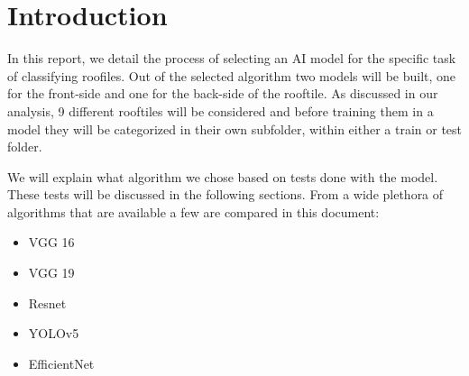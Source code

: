 \section{Introduction}

\begin{fullwidth}
    In this report, 
    we detail the process of selecting an AI model for the specific task of classifying roofiles. 
    Out of the selected algorithm two models will be built, one for the front-side and one for the back-side of the rooftile. 
    As discussed in our analysis, 9 different rooftiles will be considered and before training them in a model 
    they will be categorized in their own subfolder, within either a train or test folder.

    We will explain what algorithm we chose based on tests done with the model. These tests will be discussed in the following sections.
    From a wide plethora of algorithms that are available a few are compared in this document:
    \begin{itemize} 
    \item VGG 16
    \item VGG 19
    \item Resnet
    \item YOLOv5
    \item EfficientNet
    \end{itemize}
\end{fullwidth}
